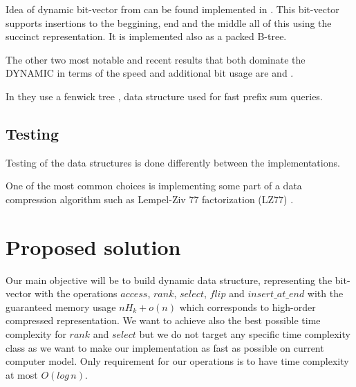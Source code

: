 Idea of dynamic bit-vector from \cite{policriti2015average} can be found implemented in \cite{ds-bitvector}. This bit-vector supports insertions to the beggining, end and the middle all of this using the succinct representation. It is implemented also as a packed B-tree.

The other two most notable and recent results that both dominate the DYNAMIC in terms of the speed and additional bit usage are \cite{marchini2020compact} and \cite{pibiri2020rank}.

In \cite{marchini2020compact} they use a fenwick tree \cite{fenwick1994new}, data structure used for fast prefix sum queries.

\subsection{Testing}

Testing of the data structures is done differently between the implementations.

One of the most common choices is implementing some part of a data compression algorithm such as Lempel-Ziv 77 factorization (LZ77) \cite{ziv1977universal}.


\section{Proposed solution}

Our main objective will be to build dynamic data structure, representing the bit-vector with the operations $access$, $rank$, $select$, $flip$ and $insert\_at\_end$ with the guaranteed memory usage $nH_k+o(n)$ which corresponds to high-order compressed representation. We want to achieve also the best possible time complexity for $rank$ and $select$ but we do not target any specific time complexity class as we want to make our implementation as fast as possible on current computer model. Only requirement for our operations is to have time complexity at most $O(log\,n)$.
